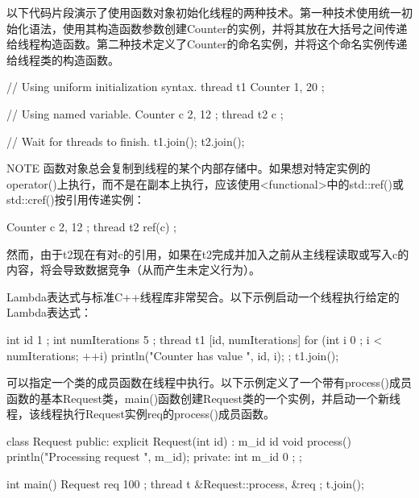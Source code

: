 以下代码片段演示了使用函数对象初始化线程的两种技术。第一种技术使用统一初始化语法，使用其构造函数参数创建Counter的实例，并将其放在大括号之间传递给线程构造函数。第二种技术定义了Counter的命名实例，并将这个命名实例传递给线程类的构造函数。

\begin{cpp}
// Using uniform initialization syntax.
thread t1 { Counter { 1, 20 } };

// Using named variable.
Counter c { 2, 12 };
thread t2 { c };

// Wait for threads to finish.
t1.join();
t2.join();
\end{cpp}

\begin{myNotic}{NOTE}
函数对象总会复制到线程的某个内部存储中。如果想对特定实例的operator()上执行，而不是在副本上执行，应该使用<functional>中的std::ref()或std::cref()按引用传递实例：

\begin{cpp}
Counter c { 2, 12 };
thread t2 { ref(c) };
\end{cpp}

然而，由于t2现在有对c的引用，如果在t2完成并加入之前从主线程读取或写入c的内容，将会导致数据竞争（从而产生未定义行为）。
\end{myNotic}


Lambda表达式与标准C++线程库非常契合。以下示例启动一个线程执行给定的Lambda表达式：

\begin{cpp}
int id { 1 };
int numIterations { 5 };
thread t1 { [id, numIterations] {
        for (int i { 0 }; i < numIterations; ++i) {
            println("Counter {} has value {}", id, i);
        }
} };
t1.join();
\end{cpp}


可以指定一个类的成员函数在线程中执行。以下示例定义了一个带有process()成员函数的基本Request类，main()函数创建Request类的一个实例，并启动一个新线程，该线程执行Request实例req的process()成员函数。

\begin{cpp}
class Request
{
    public:
        explicit Request(int id) : m_id { id } { }
        void process() { println("Processing request {}", m_id); }
    private:
        int m_id { 0 };
};

int main()
{
    Request req { 100 };
    thread t { &Request::process, &req };
    t.join();
}
\end{cpp}

